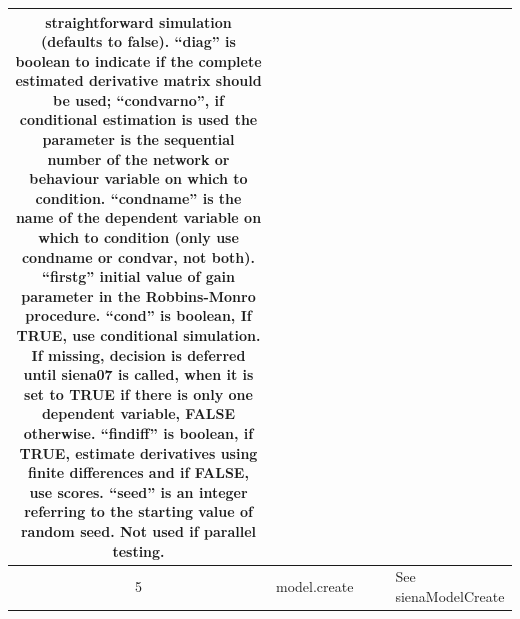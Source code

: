 \documentclass[a4paper,fleqn,11pt]{article}
\newcommand{\+}{\, + \,}
\begin{document}
{\begin{landscape}
\begin{small}
\begin{longtable}{c | p{2.4cm} | p{4.5cm} | p{4.0cm} | p{9.0cm} }
straightforward simulation (defaults to false). ``diag'' is boolean to indicate
if the complete estimated derivative matrix should be used; ``condvarno'', if
conditional estimation is used the parameter is the sequential number of the
network or behaviour variable on which to condition. ``condname'' is the name
of the dependent variable on which to condition (only use condname or condvar,
not both). ``firstg'' initial value of gain parameter in the Robbins-Monro
procedure. ``cond'' is boolean, If TRUE, use conditional simulation. If
missing, decision is deferred until siena07 is called, when it is set to TRUE
if there is only one dependent variable, FALSE otherwise. ``findiff'' is
boolean, if TRUE, estimate derivatives using finite differences and if FALSE,
use scores. ``seed'' is an integer referring to the starting value of random
seed. Not used if parallel
testing.\\
\hline

5   & model.create  & & &       See sienaModelCreate\\
\hline


\end{longtable}
\end{small}
\end{landscape}}
\end{document}
